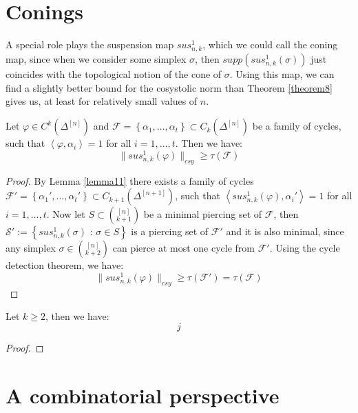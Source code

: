 \section{Conings}

A special role plays the suspension map \(sus_{n,k}^1\), which we could call the coning map, since when we consider some simplex \(\sigma\), then \(supp\left(sus_{n,k}^1(\sigma)\right)\) just coincides with the topological notion of the cone of \(\sigma\). Using this map, we can find a slightly better bound for the cosystolic norm than Theorem \ref{theorem8} gives us, at least for relatively small values of \(n\).

\begin{prop}
Let \(\varphi\in C^k(\Delta^{[n]})\) and \(\mathcal{F}=\left\{\alpha_1,\ldots,\alpha_t\right\}\subset C_k(\Delta^{[n]})\) be a family of cycles, such that \(\left\langle\varphi,\alpha_i\right\rangle=1\) for all \(i=1,\ldots,t\). Then we have:
\[
\|sus_{n,k}^1(\varphi)\|_{csy}\geq\tau(\mathcal{F})
\]
\begin{proof}
By Lemma \ref{lemma11} there exists a family of cycles\\
\(\mathcal{F}'=\left\{\alpha_1',\ldots,\alpha_t'\right\}\subset C_{k+1}(\Delta^{[n+1]})\), such that \(\left\langle sus_{n,k}^1(\varphi),\alpha_i'\right\rangle=1\) for all\\
\(i=1,\ldots,t\). Now let \(S\subset\binom{[n]}{k+1}\) be a minimal piercing set of \(\mathcal{F}\), then\\
\(\mathcal{S}':=\left\{sus_{n,k}^1(\sigma)\text{ : }\sigma\in S\right\}\) is a piercing set of \(\mathcal{F}'\) and it is also minimal, since any simplex \(\sigma\in\binom{[n]}{k+2}\) can pierce at most one cycle from \(\mathcal{F}'\). Using the cycle detection theorem, we have:
\[
\|sus_{n,k}^1(\varphi)\|_{csy}\geq\tau(\mathcal{F}')=\tau(\mathcal{F})
\]
\end{proof}
\end{prop}

\begin{thm}
Let \(k\geq 2\), then we have:
\[
j
\]
\begin{proof}

\end{proof}
\end{thm}


\section{A combinatorial perspective}

